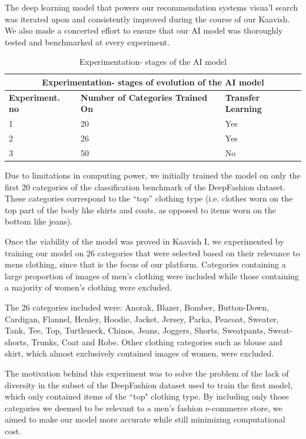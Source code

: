 The deep learning model that powers our recommendation systems visua'l search was iterated upon and consistently improved during the course of our Kaavish. We also made a concerted effort to ensure that our AI model was thoroughly tested and benchmarked at every experiment.

\begin{table}[H]
\begin{tabular}{ @{}|p{4cm}|p{5cm}|p{5cm}|  }
 \hline
 \multicolumn{3}{|c|}{\textbf{Experimentation- stages of evolution of the AI model}} \\
 \hline
 \textbf{Experiment. no} & \textbf{Number of Categories Trained On} & \textbf{Transfer Learning}\\
 
\hline
 1 & 20 & Yes \\ 
 \hline
 2 & 26 & Yes \\ 
 \hline
  3 & 50 & No \\
 \hline
\end{tabular}
\caption{Experimentation- stages of the AI model}
\label{table:Experimentation- stages of AI model}
\end{table}


Due to limitations in computing power, we initially trained the model on only the first 20 categories of the classification benchmark of the DeepFashion dataset. These categories correspond to the “top” clothing type (i.e. clothes worn on the top part of the body like shirts and coats, as opposed to items worn on the bottom like jeans). 

Once the viability of the model was proved in Kaavish I, we experimented by training our model on 26 categories that were selected based on their relevance to mens clothing, since that is the focus of our platform. Categories containing a large proportion of images of men's clothing were included while those containing a majority of women's clothing were excluded. 

The 26 categories included were: Anorak, Blazer, Bomber, Button-Down, Cardigan, Flannel, Henley, Hoodie, Jacket, Jersey, Parka, Peacoat, Sweater, Tank, Tee, Top, Turtleneck, Chinos, Jeans, Joggers, Shorts, Sweatpants, Sweat-shorts, Trunks, Coat and Robe. Other clothing categories such as blouse and skirt, which almost exclusively contained images of women, were excluded.

The motivation behind this experiment was to solve the problem of the lack of diversity in the subset of the DeepFashion dataset used to train the first model, which only contained items of the ``top" clothing type. By including only those categories we deemed to be relevant to a men’s fashion e-commerce store, we aimed to make our model more accurate while still minimizing computational cost. 

